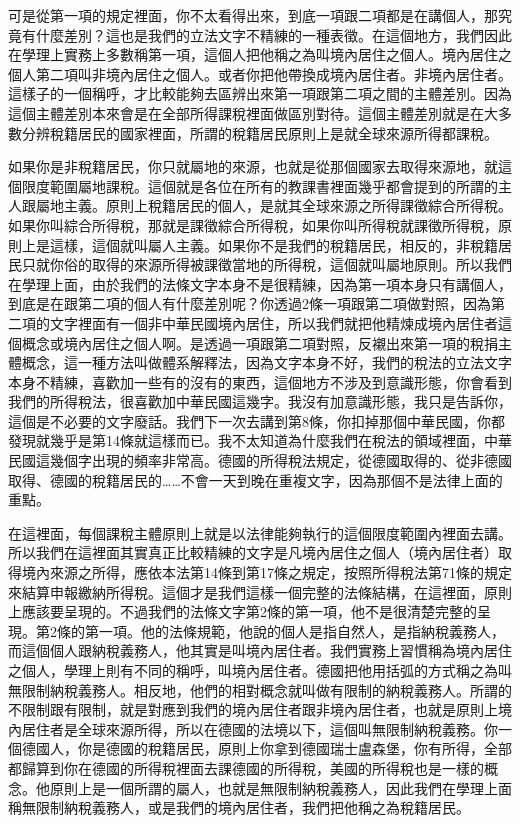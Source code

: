 \documentclass[]{ctexbook}
\begin{document}
可是從第一項的規定裡面，你不太看得出來，到底一項跟二項都是在講個人，那究竟有什麼差別？這也是我們的立法文字不精練的一種表徵。在這個地方，我們因此在學理上實務上多數稱第一項，這個人把他稱之為叫境內居住之個人。境內居住之個人第二項叫非境內居住之個人。或者你把他帶換成境內居住者。非境內居住者。這樣子的一個稱呼，才比較能夠去區辨出來第一項跟第二項之間的主體差別。因為這個主體差別本來會是在全部所得課稅裡面做區別對待。這個主體差別就是在大多數分辨稅籍居民的國家裡面，所謂的稅籍居民原則上是就全球來源所得都課稅。

如果你是非稅籍居民，你只就屬地的來源，也就是從那個國家去取得來源地，就這個限度範圍屬地課稅。這個就是各位在所有的教課書裡面幾乎都會提到的所謂的主人跟屬地主義。原則上稅籍居民的個人，是就其全球來源之所得課徵綜合所得稅。如果你叫綜合所得稅，那就是課徵綜合所得稅，如果你叫所得稅就課徵所得稅，原則上是這樣，這個就叫屬人主義。如果你不是我們的稅籍居民，相反的，非稅籍居民只就你俗的取得的來源所得被課徵當地的所得稅，這個就叫屬地原則。所以我們在學理上面，由於我們的法條文字本身不是很精練，因為第一項本身只有講個人，到底是在跟第二項的個人有什麼差別呢？你透過2條一項跟第二項做對照，因為第二項的文字裡面有一個非中華民國境內居住，所以我們就把他精煉成境內居住者這個概念或境內居住之個人啊。是透過一項跟第二項對照，反襯出來第一項的稅捐主體概念，這一種方法叫做體系解釋法，因為文字本身不好，我們的稅法的立法文字本身不精練，喜歡加一些有的沒有的東西，這個地方不涉及到意識形態，你會看到我們的所得稅法，很喜歡加中華民國這幾字。我沒有加意識形態，我只是告訴你，這個是不必要的文字廢話。我們下一次去講到第8條，你扣掉那個中華民國，你都發現就幾乎是第14條就這樣而已。我不太知道為什麼我們在稅法的領域裡面，中華民國這幾個字出現的頻率非常高。德國的所得稅法規定，從德國取得的、從非德國取得、德國的稅籍居民的\ldots\ldots 不會一天到晚在重複文字，因為那個不是法律上面的重點。

在這裡面，每個課稅主體原則上就是以法律能夠執行的這個限度範圍內裡面去講。所以我們在這裡面其實真正比較精練的文字是凡境內居住之個人（境內居住者）取得境內來源之所得，應依本法第14條到第17條之規定，按照所得稅法第71條的規定來結算申報繳納所得稅。這個才是我們這樣一個完整的法條結構，在這裡面，原則上應該要呈現的。不過我們的法條文字第2條的第一項，他不是很清楚完整的呈現。第2條的第一項。他的法條規範，他說的個人是指自然人，是指納稅義務人，而這個個人跟納稅義務人，他其實是叫境內居住者。我們實務上習慣稱為境內居住之個人，學理上則有不同的稱呼，叫境內居住者。德國把他用括弧的方式稱之為叫無限制納稅義務人。相反地，他們的相對概念就叫做有限制的納稅義務人。所謂的不限制跟有限制，就是對應到我們的境內居住者跟非境內居住者，也就是原則上境內居住者是全球來源所得，所以在德國的法境以下，這個叫無限制納稅義務。你一個德國人，你是德國的稅籍居民，原則上你拿到德國瑞士盧森堡，你有所得，全部都歸算到你在德國的所得稅裡面去課德國的所得稅，美國的所得稅也是一樣的概念。他原則上是一個所謂的屬人，也就是無限制納稅義務人，因此我們在學理上面稱無限制納稅義務人，或是我們的境內居住者，我們把他稱之為稅籍居民。
\end{document}
